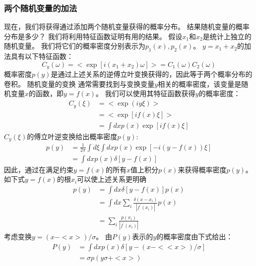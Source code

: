 \documentclass[12pt, UTF8]{ctexart}%
\numberwithin{equation}{section}
\numberwithin{figure}{section}
\newcommand{\InsertEqution}[2]{\begin{equation}
  \label{#1}
   #2
 \end{equation}}
\newcommand{\InsertInlineEq}[1]{$#1$}
\begin{document}
\begin{sloppypar}
\subsubsection{两个随机变量的加法}
现在，我们将获得通过添加两个随机变量获得的概率分布。 结果随机变量的概率分布是多少？ 我们将利用特征函数证明有用的结果。 假设\InsertInlineEq{x_1}和\InsertInlineEq{x_2}是统计上独立的随机变量。 我们将它们的概率密度分别表示为\InsertInlineEq{p_1 (x),p_2 (x)}。 \InsertInlineEq{y=x_1+x_2}的加法具有以下特征函数：
\InsertEqution{7.26}{C_{y}(\omega)=<\exp \left[i\left(x_{1}+x_{2}\right) \omega\right]>=C_{1}(\omega) C_{2}(\omega)}
概率密度\InsertInlineEq{p(y)}是通过上述关系的逆傅立叶变换获得的，因此等于两个概率分布的卷积。
\InsertInlineEq{随机变量的变换}
通常需要找到与变换变量\InsertInlineEq{y}相关的概率密度，该变量是随机变量\InsertInlineEq{x}的函数，即\InsertInlineEq{y=f(x)}。 我们可以使用其特征函数获得\InsertInlineEq{y}的概率密度：
\InsertEqution{7.27}{\begin{aligned}
  C_{y}(\xi) &=<\exp (i y \xi)>\\
  &=<\exp [i f(x) \xi]>\\
  &=\int d x p(x) \exp [i f(x) \xi]
  \end{aligned}}
  \InsertInlineEq{ C_{y}(\xi) }的傅立叶逆变换给出概率密度\InsertInlineEq{ p(y)}:
  \InsertEqution{7.28}{\begin{aligned}
    p(y) &=\frac{1}{2 \pi} \int d \xi \int d x p(x) \exp [-i(y-f(x)) \xi] \\
    &=\int d x p(x) \delta[y-f(x)]
    \end{aligned}}
   因此，通过在满足约束\InsertInlineEq{y=f(x)}的所有\InsertInlineEq{x}值上积分\InsertInlineEq{p(x)}来获得概率密度\InsertInlineEq{p(y)}。 如下式\InsertInlineEq{y=f(x)}的根\InsertInlineEq{x_i}可以使上述关系更明确 
   \InsertEqution{7.29}{\begin{aligned}
    p(y) &=\int d x \delta[y-f(x)] p(x) \\
    &=\int d x \sum_{i} \frac{\delta\left(x-x_{i}\right)}{\left|f^{\prime}\left(x_{i}\right)\right|} p(x) \\
    &=\sum_{i} \frac{p\left(x_{i}\right)}{\left|f^{\prime}\left(x_{i}\right)\right|}
    \end{aligned}}
    考虑变换\InsertInlineEq{y=(x-<x>)/\sigma}。 由\InsertInlineEq{P(y)}表示的\InsertInlineEq{y}的概率密度由下式给出：
    \InsertEqution{7.30}{\begin{aligned}
      P(y) &=\int d x p(x) \delta[y-(x-<<x>) / \sigma] \\
      &=\sigma p(y \sigma+<x>)
      \end{aligned}}    

\end{sloppypar}
\end{document}
